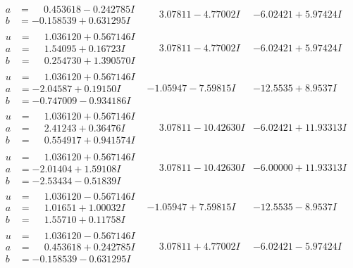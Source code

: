 \documentclass[1p]{elsarticle_modified}
\theoremstyle{definition}
\begin{document}
$$\begin{array}{c|c|c}
\begin{aligned}
a &= \phantom{-}0.453618 - 0.242785 I \\
b &= -0.158539 + 0.631295 I\end{aligned}
 & \phantom{-}3.07811 - 4.77002 I & -6.02421 + 5.97424 I \\ \hline\begin{aligned}
u &= \phantom{-}1.036120 + 0.567146 I \\
a &= \phantom{-}1.54095 + 0.16723 I \\
b &= \phantom{-}0.254730 + 1.390570 I\end{aligned}
 & \phantom{-}3.07811 - 4.77002 I & -6.02421 + 5.97424 I \\ \hline\begin{aligned}
u &= \phantom{-}1.036120 + 0.567146 I \\
a &= -2.04587 + 0.19150 I \\
b &= -0.747009 - 0.934186 I\end{aligned}
 & -1.05947 - 7.59815 I & -12.5535 + 8.9537 I \\ \hline\begin{aligned}
u &= \phantom{-}1.036120 + 0.567146 I \\
a &= \phantom{-}2.41243 + 0.36476 I \\
b &= \phantom{-}0.554917 + 0.941574 I\end{aligned}
 & \phantom{-}3.07811 - 10.42630 I & -6.02421 + 11.93313 I \\ \hline\begin{aligned}
u &= \phantom{-}1.036120 + 0.567146 I \\
a &= -2.01404 + 1.59108 I \\
b &= -2.53434 - 0.51839 I\end{aligned}
 & \phantom{-}3.07811 - 10.42630 I & -6.00000 + 11.93313 I \\ \hline\begin{aligned}
u &= \phantom{-}1.036120 - 0.567146 I \\
a &= \phantom{-}1.01651 + 1.00032 I \\
b &= \phantom{-}1.55710 + 0.11758 I\end{aligned}
 & -1.05947 + 7.59815 I & -12.5535 - 8.9537 I \\ \hline\begin{aligned}
u &= \phantom{-}1.036120 - 0.567146 I \\
a &= \phantom{-}0.453618 + 0.242785 I \\
b &= -0.158539 - 0.631295 I\end{aligned}
 & \phantom{-}3.07811 + 4.77002 I & -6.02421 - 5.97424 I \\ \hline\begin{aligned}

\end{aligned}
\end{array}$$
\end{document}
